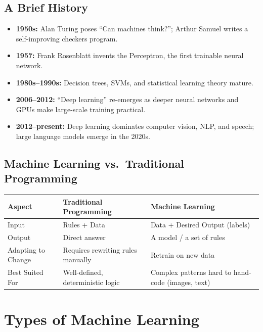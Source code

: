 \documentclass[11pt,a4paper]{article}
\begin{document}
\subsection{A Brief History}
\begin{itemize}[leftmargin=*]
  \item \textbf{1950s:} Alan Turing poses ``Can machines think?''; Arthur Samuel writes a self-improving checkers program.
  \item \textbf{1957:} Frank Rosenblatt invents the Perceptron, the first trainable neural network.
  \item \textbf{1980s--1990s:} Decision trees, SVMs, and statistical learning theory mature.
  \item \textbf{2006--2012:} ``Deep learning'' re-emerges as deeper neural networks and GPUs make large-scale training practical.
  \item \textbf{2012--present:} Deep learning dominates computer vision, NLP, and speech; large language models emerge in the 2020s.
\end{itemize}

\subsection{Machine Learning vs.\ Traditional Programming}
\begin{center}
\begin{tabular}{@{}p{3.0cm}p{5.4cm}p{5.4cm}@{}}
\toprule
\rowcolor{primary!15}
\textbf{Aspect} & \textbf{Traditional Programming} & \textbf{Machine Learning} \\
\midrule
Input & Rules + Data & Data + Desired Output (labels) \\
Output & Direct answer & A model / a set of rules \\
Adapting to Change & Requires rewriting rules manually & Retrain on new data \\
Best Suited For & Well-defined, deterministic logic & Complex patterns hard to hand-code (images, text) \\
\bottomrule
\end{tabular}
\end{center}

\section{Types of Machine Learning}
\end{document}
